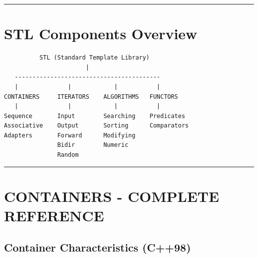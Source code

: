 \begin{center}\rule{0.5\linewidth}{0.5pt}\end{center}

\hypertarget{stl-components-overview}{%
\section{STL Components Overview}\label{stl-components-overview}}

\begin{lstlisting}
          STL (Standard Template Library)  
                       |
   -----------------------------------------
   |              |            |           |
CONTAINERS     ITERATORS    ALGORITHMS   FUNCTORS
   |              |            |           |
Sequence       Input        Searching    Predicates
Associative    Output       Sorting      Comparators
Adapters       Forward      Modifying      
               Bidir        Numeric      
               Random       
\end{lstlisting}

\begin{center}\rule{0.5\linewidth}{0.5pt}\end{center}

\hypertarget{containers---complete-reference}{%
\section{CONTAINERS - COMPLETE
REFERENCE}\label{containers---complete-reference}}

\hypertarget{container-characteristics-c98}{%
\subsection{Container Characteristics
(C++98)}\label{container-characteristics-c98}}

